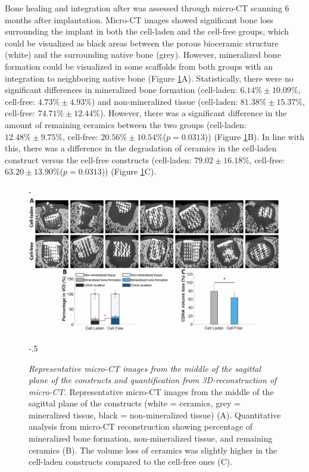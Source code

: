 \documentclass[twocolumn, empirical, authordate, issue]{jote-new-article}
\begin{document}
Bone healing and integration after was assessed through micro-CT scanning 6 months after implantation. Micro-CT images showed significant bone loss surrounding the implant in both the cell-laden and the cell-free groups, which could be visualized as black areas between the porous bioceramic structure (white) and the surrounding native bone (grey). However, mineralized bone formation could be visualized in some scaffolds from both groups with an integration to neighboring native bone (Figure \ref{fig:figure10}A). Statistically, there were no significant differences in mineralized bone formation (cell-laden: $6.14\% \pm 10.09\%$, cell-free: $4.73\% \pm 4.93\%$) and non-mineralized tissue (cell-laden:  $ 81.38\% \pm 15.37\% $, cell-free:  $ 74.71\% \pm 12.44\%$). However, there was a significant difference in the amount of remaining ceramics between the two groups (cell-laden:  $ 12.48\% \pm 9.75\% $, cell-free:  $ 20.56\% \pm 10.54\% $($p = 0.0313$)) (Figure \ref{fig:figure10}B). In line with this, there was a difference in the degradation of ceramics in the cell-laden construct versus the cell-free constructs (cell-laden:  $ 79.02 \pm 16.18 \% $, cell-free:  $ 63.20 \pm 13.90 \% $($p = 0.0313$)) (Figure \ref{fig:figure10}C).

\begin{figure}[t!]
\captionsetup{width=\dimexpr \linewidth + \fullwidthlen\relax}

\begin{adjustwidth}{-\fullwidthlen}{}
\includegraphics[width=\textwidth+\fullwidthlen]{media/image10.jpg}
\end{adjustwidth}
\begin{adjustwidth}{-.5\fullwidthlen}{}

\caption{\emph{Representative micro-CT images from the middle of the sagittal plane of the constructs and quantification from 3D-reconstruction of micro-CT.} Representative micro-CT images from the middle of the sagittal plane of the constructs (white = ceramics, grey = mineralized tissue, black = non-mineralized tissue) (A). Quantitative analysis from micro-CT reconstruction showing percentage of mineralized bone formation, non-mineralized tissue, and remaining ceramics (B). The volume loss of ceramics was slightly higher in the cell-laden constructs compared to the cell-free ones (C).}
\label{fig:figure10}
\end{adjustwidth}
\end{figure}
\end{document}
